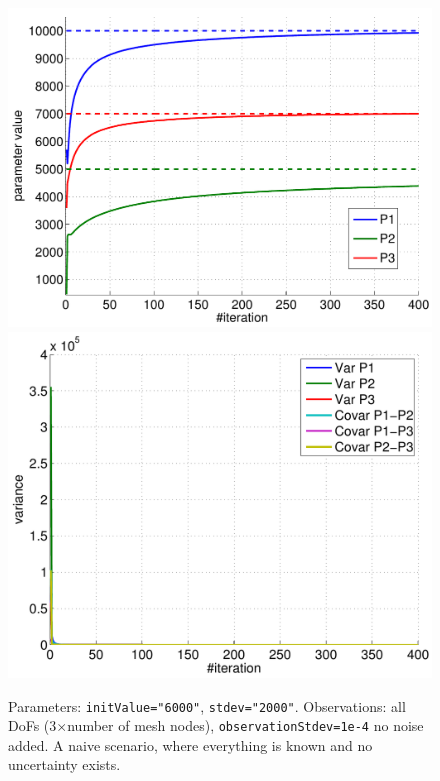 \documentclass[10pt]{article}
\begin{document}
\begin{figure}[h]
\begin{center}
\includegraphics[width=.49\linewidth]{figures/p1_estim.pdf}
\hfill
\includegraphics[width=.49\linewidth]{figures/p1_var.pdf}
\caption{Parameters: \texttt{initValue="6000"}, \texttt{stdev="2000"}. Observations: all DoFs (3$\times$number of mesh nodes),
\texttt{observationStdev=1e-4} no noise added. A naive scenario, where everything is known and no uncertainty exists.}
\label{fig:Results1}
\end{center}
\end{figure}
\end{document}
